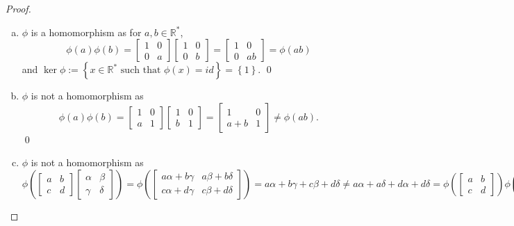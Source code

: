 \documentclass{article}
\theoremstyle{definition}
\newcommand{\R}{\mathbb{R}}
\begin{document}
	\begin{proof}
		\hfill 
		\begin{enumerate}[(a)]
			\item $\phi$ is a homomorphism as for $a,b\in \R^*$, \[
			\phi(a)\phi(b) = \begin{bmatrix} 1 & 0 \\ 0 & a \end{bmatrix} \begin{bmatrix} 1 & 0 \\ 0 & b \end{bmatrix} = \begin{bmatrix} 1 & 0 \\ 0 & ab \end{bmatrix} = \phi(ab)
			\] and $\ker\phi := \left\{x\in\R^* \text{ such that } \phi(x)=id \right\} = \left\{1\right\}$. \qed
			
			\item $\phi$ is not a homomorphism as \[
			\phi(a)\phi(b) = \begin{bmatrix} 1 & 0 \\ a & 1 \end{bmatrix} \begin{bmatrix} 1 & 0 \\ b & 1 \end{bmatrix} = \begin{bmatrix} 1 & 0 \\ a+b & 1 \end{bmatrix} \not= \phi(ab)\text{.}\]\hfill\qed
			
			\item $\phi$ is not a homomorphism as \[
			\phi\left(\begin{bmatrix} a & b \\ c & d \end{bmatrix} \begin{bmatrix} \alpha & \beta \\ \gamma & \delta \end{bmatrix}\right) = \phi\left(\begin{bmatrix} a\alpha + b\gamma & a\beta + b\delta \\ c\alpha + d\gamma & c\beta + d\delta \end{bmatrix}\right) = a\alpha + b\gamma + c\beta + d\delta \not= a\alpha + a\delta + d\alpha + d\delta = \phi\left(\begin{bmatrix} a & b \\ c & d \end{bmatrix}\right) \phi\left(\begin{bmatrix} \alpha & \beta \\ \gamma & \delta \end{bmatrix}\right)\text{.}
			\]
			

\end{enumerate}
\end{proof}
\end{document}
